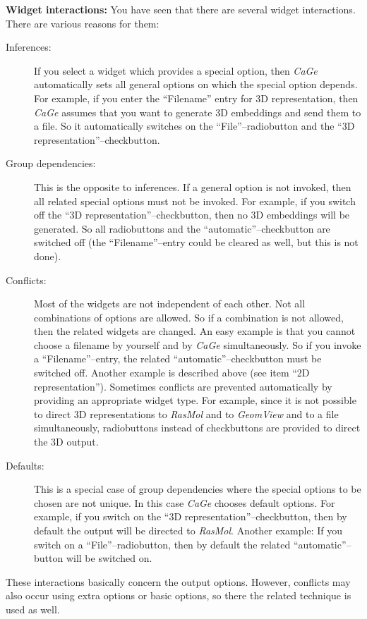 \documentclass[a4paper]{article}
\def\CaGe{\textit{CaGe}}
\begin{document}
\noindent
\textbf{Widget interactions:} You have seen that there are several widget 
interactions. There are various reasons for them:
\begin{description}
\item[Inferences:] If you select a widget which provides a special option,
then \CaGe{} automatically sets all general options on which the special
option depends. For example, if you enter the ``Filename'' entry for
3D representation, then \CaGe{} assumes that you want to generate 
3D embeddings and send them to a file. So it automatically switches on the
``File''--radiobutton and the ``3D representation''--checkbutton.
\item[Group dependencies:] This is the opposite to inferences. If a general
 option is not invoked, then all related special options must not be invoked.
For example, if you switch off the ``3D representation''--checkbutton, then
no 3D embeddings will be generated. So all radiobuttons and the 
``automatic''--checkbutton are switched off (the ``Filename''--entry could be
cleared as well, but this is not done).
\item[Conflicts:] Most of the widgets are not independent of each other. Not
all combinations of options are allowed. So if a combination is not allowed,
then the related widgets are changed. An easy example is that you cannot
choose a filename by yourself and by \CaGe{} simultaneously. So if you invoke
a ``Filename''--entry, the related ``automatic''--checkbutton must be switched
off. Another example is described above (see item ``2D representation'').
Sometimes conflicts are prevented automatically by providing an appropriate
widget type. For
example, since it is not possible to direct 3D representations to
\textit{RasMol} and to \textit{GeomView} and to a file simultaneously, 
radiobuttons instead of checkbuttons are provided to direct the 3D output.  
\item[Defaults:] This is a special case of group dependencies where the 
special options to be chosen are not unique. In this case \CaGe{} chooses
default options. For example, if you switch on the 
``3D representation''--checkbutton, then by default the output will be directed
to \textit{RasMol}. Another example: If you switch on a ``File''--radiobutton,
then by default the related ``automatic''--button will be switched on.     
\end{description}
These interactions basically concern the output options. However, conflicts
may also occur using extra options or basic options, so there the related
technique is used as well.
\end{document}
